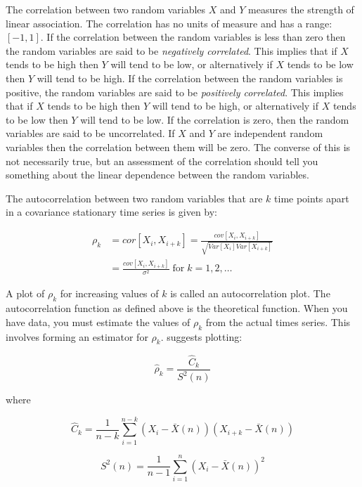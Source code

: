 \documentclass[
]{book}
\theoremstyle{definition}
\theoremstyle{definition}
\theoremstyle{definition}
\theoremstyle{definition}
\theoremstyle{remark}
\begin{document}
The correlation between two random variables \(X\) and \(Y\) measures the
strength of linear association. The correlation has no units of measure
and has a range: \(\left[-1, 1 \right]\). If the correlation between the
random variables is less than zero then the random variables are said to
be \emph{negatively correlated}. This implies that if \(X\) tends to be high
then \(Y\) will tend to be low, or alternatively if \(X\) tends to be low
then \(Y\) will tend to be high. If the correlation between the random
variables is positive, the random variables are said to be \emph{positively
correlated}. This implies that if \(X\) tends to be high then \(Y\) will
tend to be high, or alternatively if \(X\) tends to be low then \(Y\) will
tend to be low. If the correlation is zero, then the random variables
are said to be uncorrelated. If \(X\) and \(Y\) are independent random
variables then the correlation between them will be zero. The converse
of this is not necessarily true, but an assessment of the correlation
should tell you something about the linear dependence between the random
variables.

The autocorrelation between two random variables that are \(k\) time
points apart in a covariance stationary time series is given by:

\[\begin{split}
\rho_{k} & = cor[X_{i},X_{i+k}] = \frac{cov[X_{i},X_{i+k}]}{\sqrt{Var[X_{i}] Var[X_{i+k}]}}\\
 & = \frac{cov[X_{i},X_{i+k}]}{\sigma^2} \; \text{for} \; k = 1,2,\dots \;
\end{split}\]

A plot of \(\rho_{k}\) for increasing values of \(k\) is called an
autocorrelation plot. The autocorrelation function as defined above is
the theoretical function. When you have data, you must estimate the
values of \(\rho_{k}\) from the actual times series. This involves forming
an estimator for \(\rho_{k}\). \citep{law2007simulation} suggests plotting:

\[\hat{\rho}_{k} = \frac{\hat{C}_{k}}{S^{2}(n)}\]

where

\begin{equation}
\hat{C}_{k} = \frac{1}{n-k}\sum\limits_{i=1}^{n-k}\left(X_{i} - \bar{X}(n) \right)\left(X_{i+k} - \bar{X}(n) \right)
\label{eq:CovEst}
\end{equation}

\begin{equation}
S^{2}(n) = \frac{1}{n-1}\sum\limits_{i=1}^{n}\left(X_{i} - \bar{X}(n) \right)^2
\label{eq:SampleVar}
\end{equation}
\end{document}
